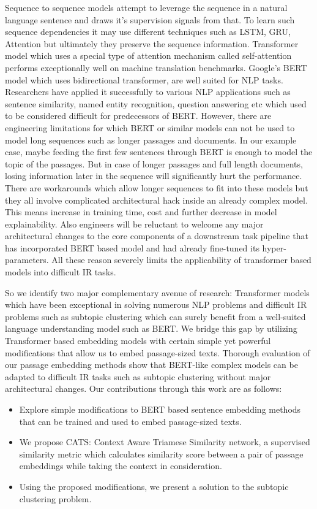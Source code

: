 \documentclass[sigconf,authordraft]{acmart}
\begin{document}
Sequence to sequence models attempt to leverage the sequence in a natural language sentence and draws it's supervision signals from that. To learn such sequence dependencies it may use different techniques such as LSTM, GRU, Attention but ultimately they preserve the sequence information. Transformer model which uses a special type of attention mechanism called self-attention performs exceptionally well on machine translation benchmarks. Google's BERT model which uses bidirectional transformer, are well suited for NLP tasks. Researchers have applied it successfully to various NLP applications such as sentence similarity, named entity recognition, question answering etc which used to be considered difficult for predecessors of BERT. However, there are engineering limitations for which BERT or similar models can not be used to model long sequences such as longer passages and documents. In our example case, maybe feeding the first few sentences through BERT is enough to model the topic of the passages. But in case of longer passages and full length documents, losing information later in the sequence will significantly hurt the performance. There are workarounds which allow longer sequences to fit into these models but they all involve complicated architectural hack inside an already complex model. This means increase in training time, cost and further decrease in model explainability. Also engineers will be reluctant to welcome any major architectural changes to the core components of a downstream task pipeline that has incorporated BERT based model and had already fine-tuned its hyper-parameters. All these reason severely limits the applicability of transformer based models into difficult IR tasks.

So we identify two major complementary avenue of research: Transformer models which have been exceptional in solving numerous NLP problems and difficult IR problems such as subtopic clustering which can surely benefit from a well-suited language understanding model such as BERT. We bridge this gap by utilizing Transformer based embedding models with certain simple yet powerful modifications that allow us to embed passage-sized texts. Thorough evaluation of our passage embedding methods show that BERT-like complex models can be adapted to difficult IR tasks such as subtopic clustering without major architectural changes. Our contributions through this work are as follows:

\begin{itemize}
    \item Explore simple modifications to BERT based sentence embedding methods that can be trained and used to embed passage-sized texts.
    \item We propose CATS: Context Aware Triamese Similarity network, a supervised similarity metric which calculates similarity score between a pair of passage embeddings while taking the context in consideration.
    \item Using the proposed modifications, we present a solution to the subtopic clustering problem.
\end{itemize}
\end{document}
